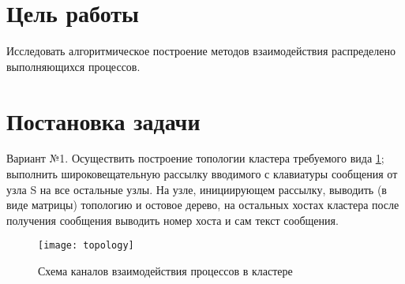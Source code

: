 \documentclass[a4paper,14pt]{extarticle}
\begin{document}


\section{Цель работы}
Исследовать алгоритмическое построение методов взаимодействия распределено
выполняющихся процессов.

\section{Постановка задачи}
Вариант №1. Осуществить построение топологии кластера требуемого вида \ref{fig:topology};
выполнить широковещательную рассылку вводимого с клавиатуры сообщения от узла S
на все остальные узлы. На узле, инициирующем рассылку, выводить (в виде матрицы)
топологию и остовое дерево, на остальных хостах кластера после получения
сообщения выводить номер хоста и сам текст сообщения.

\begin{figure}[H]
    \centering
    \texttt{[image: topology]}
    \caption{Схема каналов взаимодействия процессов в кластере}
    \label{fig:topology}
\end{figure}
\end{document}
